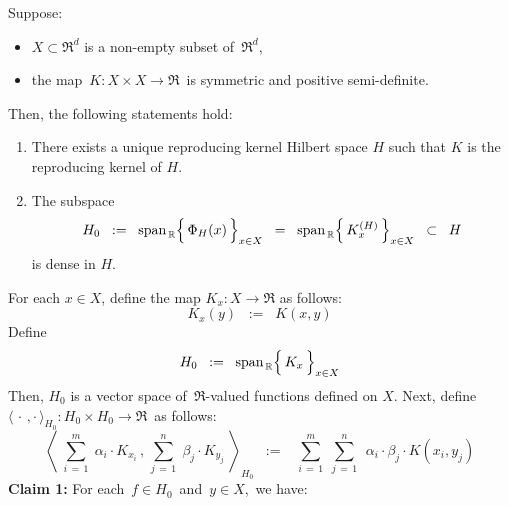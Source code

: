 \vskip 0.5cm
\begin{theorem}
\mbox{}
\vskip 0.1cm
\noindent
Suppose:
\begin{itemize}
\item
	$X \subset \Re^{d}$ is a non-empty subset of \,$\Re^{d}$,
\item
	the map \,$K : X \times X \longrightarrow \Re$\, is symmetric and positive semi-definite.
\end{itemize}
Then, the following statements hold:
\begin{enumerate}
\item
	There exists a unique reproducing kernel Hilbert space $H$ such that
	$K$ is the reproducing kernel of $H$.
\item
	The subspace
	\begin{equation*}
	H_{0}
	\;\; := \;\;
		\span_{\,\Re}\!\left\{\,\overset{{\color{white}.}}{\Phi_{H}(x)}\,\right\}_{x \in X}
	\;\; = \;\;
		\span_{\,\Re}\!\left\{\,K^{(H)}_{x}\,\right\}_{x \in X}
	\;\; \subset \;\;
		H
	\end{equation*}
	is dense in $H$.
\end{enumerate}
\end{theorem}
\proof
For each $x \in X$, define the map $K_{x} : X \longrightarrow \Re$ as follows:
\begin{equation*}
K_{x}(y) \;\; := \;\; K(x,y)
\end{equation*}
Define
\begin{equation*}
H_{0}
\;\; := \;\;
	\span_{\,\Re}\!\left\{\,\overset{{\color{white}.}}{K_{x}}\,\right\}_{x \in X}
\end{equation*}
Then, $H_{0}$ is a vector space of \,$\Re$-valued functions defined on $X$.
Next, define
\,$\langle\,\cdot\,,\cdot\,\rangle_{H_{0}} : H_{0} \times H_{0} \longrightarrow \Re$\,
as follows:
\begin{equation*}
\left\langle\;
	\overset{m}{\underset{i\,=\,1}{\sum}}\; \alpha_{i} \cdot K_{x_{i}}
	\,,\,
	\overset{n}{\underset{j\,=\,1}{\sum}}\; \beta_{j} \cdot K_{y_{j}}
	\;\right\rangle_{\!\!H_{0}}
\;\; := \;\;\;
	\overset{m}{\underset{i\,=\,1}{\sum}}\;
	\overset{n}{\underset{j\,=\,1}{\sum}}\;\,
	\alpha_{i} \cdot \beta_{j} \cdot K(x_{i},y_{j})
\end{equation*}
\vskip 0.3cm
\noindent
\textbf{Claim 1:}\quad
For each \,$f \in H_{0}$\, and \,$y \in X$,\, we have:
